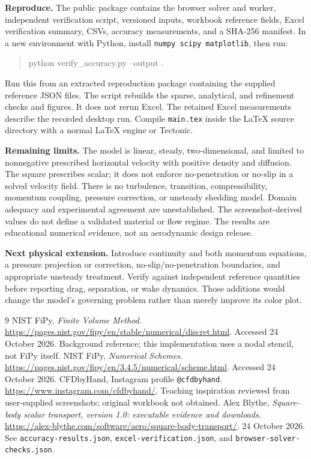 \documentclass[11pt,letterpaper]{article}
\begin{document}
\textbf{Reproduce.} The public package contains the browser solver and worker, independent verification script, versioned inputs, workbook reference fields, Excel verification summary, CSVs, accuracy measurements, and a SHA-256 manifest. In a new environment with Python, install \texttt{numpy scipy matplotlib}, then run:
\begin{quote}\small\ttfamily
python verify\_accuracy.py --output .
\end{quote}
Run this from an extracted reproduction package containing the supplied reference JSON files. The script rebuilds the sparse, analytical, and refinement checks and figures. It does not rerun Excel. The retained Excel measurements describe the recorded desktop run. Compile \texttt{main.tex} inside the LaTeX source directory with a normal LaTeX engine or Tectonic.

\textbf{Remaining limits.} The model is linear, steady, two-dimensional, and limited to nonnegative prescribed horizontal velocity with positive density and diffusion. The square prescribes scalar; it does not enforce no-penetration or no-slip in a solved velocity field. There is no turbulence, transition, compressibility, momentum coupling, pressure correction, or unsteady shedding model. Domain adequacy and experimental agreement are unestablished. The screenshot-derived values do not define a validated material or flow regime. The results are educational numerical evidence, not an aerodynamic design release.

\textbf{Next physical extension.} Introduce continuity and both momentum equations, a pressure projection or correction, no-slip/no-penetration boundaries, and appropriate unsteady treatment. Verify against independent reference quantities before reporting drag, separation, or wake dynamics. Those additions would change the model's governing problem rather than merely improve its color plot.

\begin{thebibliography}{9}\small
{} NIST FiPy, \emph{Finite Volume Method}. \url{https://pages.nist.gov/fipy/en/stable/numerical/discret.html}. Accessed 24 October 2026. Background reference; this implementation uses a nodal stencil, not FiPy itself.
 NIST FiPy, \emph{Numerical Schemes}. \url{https://pages.nist.gov/fipy/en/3.4.5/numerical/scheme.html}. Accessed 24 October 2026.
 CFDbyHand, Instagram profile \texttt{@cfdbyhand}. \url{https://www.instagram.com/cfdbyhand/}. Teaching inspiration reviewed from user-supplied screenshots; original workbook not obtained.
 Alex Blythe, \emph{Square-body scalar transport, version 1.0: executable evidence and downloads}. \url{https://alex-blythe.com/software/aero/square-body-transport/}. 24 October 2026. See \texttt{accuracy-results.json}, \texttt{excel-verification.json}, and \texttt{browser-solver-checks.json}.
\end{thebibliography}
\end{document}

